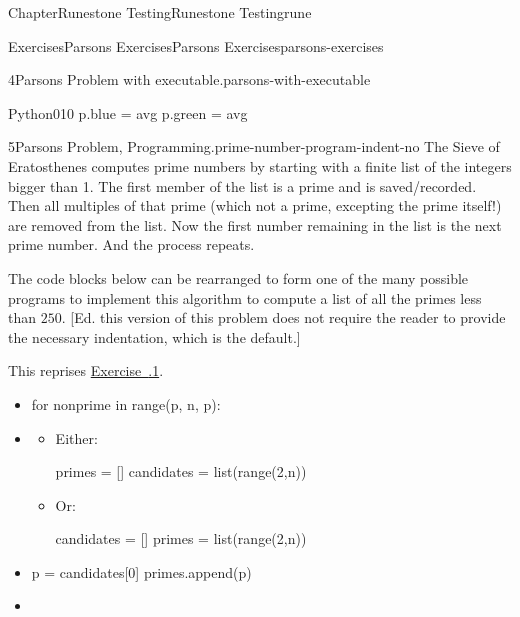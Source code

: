 \documentclass[oneside,10pt,]{book}
\newcommand{\xreffont}{\relax}
\numberwithin{equation}{section}
\begin{document}
\begin{chapterptx}{Chapter}{Runestone Testing}{}{Runestone Testing}{}{}{rune}
\begin{exercises-section}{Exercises}{Parsons Exercises}{}{Parsons Exercises}{}{}{parsons-exercises}
\begin{divisionexercise}{4}{Parsons Problem with executable.}{}{parsons-with-executable}
\begin{program}{Python}{0}{1}{0}
        p.blue = avg
        p.green = avg
\end{program}
\end{divisionexercise}%
\begin{divisionexercise}{5}{Parsons Problem, Programming.}{}{prime-number-program-indent-no}%
%
%
The Sieve of Eratosthenes computes prime numbers by starting with a finite list of the integers bigger than 1.  The first member of the list is a prime and is saved\slash{}recorded.  Then all multiples of that prime (which not a prime, excepting the prime itself!) are removed from the list.  Now the first number remaining in the list is the next prime number.  And the process repeats.%
\par
The code blocks below can be rearranged to form one of the many possible programs to implement this algorithm to compute a list of all the primes less than \(250\). [Ed. this version of this problem does not require the reader to provide the necessary indentation, which is the default.]%
\par
This reprises \hyperlink{sieve-primes}{Exercise~{\xreffont 2.5.1}}.%
\par
%
\begin{itemize}[label=\textbullet]
\item{}%
\begin{codedisplayleft}[showspaces=true]
    for nonprime in range(p, n, p):
\end{codedisplayleft}
%
\item{}%
\begin{itemize}[label=]
\item{}Either:%
\par
%
\begin{codedisplay}
primes = []
candidates = list(range(2,n))
\end{codedisplay}
%
\item{}Or:%
\par
%
\begin{codedisplay}
candidates = []
primes = list(range(2,n))
\end{codedisplay}
%
\end{itemize}
%
\item{}%
\begin{codedisplayleft}[showspaces=true]
    p = candidates[0]
    primes.append(p)
\end{codedisplayleft}
%
\item{}%
\begin{codedisplayleft}[showspaces=true]

\end{codedisplayleft}
\end{itemize}
\end{divisionexercise}
\end{exercises-section}
\end{chapterptx}
\end{document}

